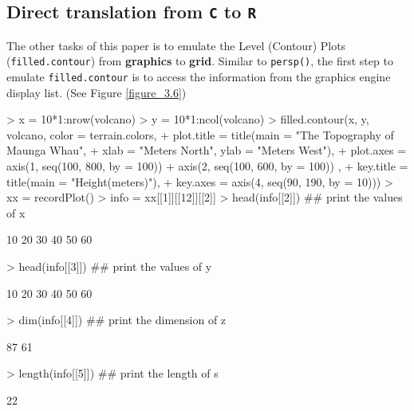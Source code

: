 \documentclass{report}
\begin{document}
\subsection{Direct translation from \texttt{C} to \texttt{R}}
The other tasks of this paper is to emulate the Level (Contour) Plots (\texttt{filled.contour}) from \textbf{graphics} to \textbf{grid}. Similar to \texttt{persp()}, the first step to emulate \texttt{filled.contour} is to access the information from the graphics engine display list. (See Figure \ref{figure_3.6})
\begin{Schunk}
\begin{Sinput}
> x = 10*1:nrow(volcano)
> y = 10*1:ncol(volcano)
> filled.contour(x, y, volcano, color = terrain.colors,
+               plot.title = title(main = "The Topography of Maunga Whau",
+               xlab = "Meters North", ylab = "Meters West"),
+               plot.axes = { axis(1, seq(100, 800, by = 100))
+               axis(2, seq(100, 600, by = 100)) },
+               key.title = title(main = "Height\n(meters)"),
+               key.axes = axis(4, seq(90, 190, by = 10)))
> xx = recordPlot()
> info = xx[[1]][[12]][[2]]
> head(info[[2]])  ## print the values of x
\end{Sinput}
\begin{Soutput}
[1] 10 20 30 40 50 60
\end{Soutput}
\begin{Sinput}
> head(info[[3]])  ## print the values of y
\end{Sinput}
\begin{Soutput}
[1] 10 20 30 40 50 60
\end{Soutput}
\begin{Sinput}
> dim(info[[4]])  ## print the dimension of z
\end{Sinput}
\begin{Soutput}
[1] 87 61
\end{Soutput}
\begin{Sinput}
> length(info[[5]])  ## print the length of s
\end{Sinput}
\begin{Soutput}
[1] 22
\end{Soutput}
\end{Schunk}
\end{document}

